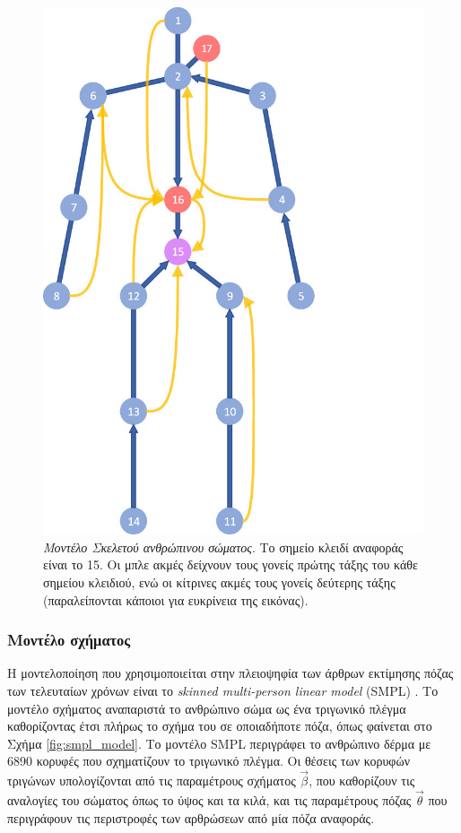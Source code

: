 \begin{figure}[h]
    \centering
    \includegraphics[scale=1.5]{images/chapter2/3d_pose_estimation/skeleton_human_model.jpg}
    \caption[Μοντέλο Σκελετού]{\textsl{Μοντέλο Σκελετού ανθρώπινου σώματος}. Το σημείο κλειδί αναφοράς είναι το 15. Οι μπλε ακμές δείχνουν τους γονείς πρώτης τάξης του κάθε σημείου κλειδιού, ενώ οι κίτρινες ακμές τους γονείς δεύτερης τάξης (παραλείπονται κάποιοι για ευκρίνεια της εικόνας).}
    \label{fig:skeleton_model}
\end{figure}
    
\subsubsection{Μοντέλο σχήματος}
\label{section:smpl_model}
Η μοντελοποίηση που χρησιμοποιείται στην πλειοψηφία των άρθρων εκτίμησης πόζας των τελευταίων χρόνων είναι το \textsl{skinned multi-person linear model} (SMPL) \cite{smpl_paper}. Το μοντέλο σχήματος αναπαριστά το ανθρώπινο σώμα ως ένα τριγωνικό πλέγμα καθορίζοντας έτσι πλήρως το σχήμα του σε οποιαδήποτε πόζα, όπως φαίνεται στο Σχήμα \ref{fig:smpl_model}. Το μοντέλο SMPL περιγράφει το ανθρώπινο δέρμα με 6890 κορυφές που σχηματίζουν το τριγωνικό πλέγμα. Οι θέσεις των κορυφών τριγώνων υπολογίζονται από τις παραμέτρους σχήματος $\vec{\beta}$, που καθορίζουν τις αναλογίες του σώματος όπως το ύψος και τα κιλά, και τις παραμέτρους πόζας $\vec{\theta}$ που περιγράφουν τις περιστροφές των αρθρώσεων από μία πόζα αναφοράς.
    

